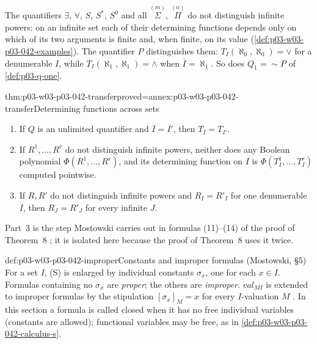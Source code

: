 The quantifiers \(\exists\), \(\forall\), \(S\), \(S^{*}\), \(S^0\) and
all \(\overset{(m)}{\Sigma}\), \(\overset{(n)}{\Pi}\) do not distinguish
infinite powers: on an infinite set each of their determining functions
depends only on which of its two arguments is finite and, when finite, on
its value (\cref{def:p03-w03-p03-042-examples}).  The quantifier \(P\)
distinguishes them: \(T_I(\aleph_0,\aleph_0)=\vee\) for a denumerable
\(I\), while \(T_I(\aleph_1,\aleph_1)=\wedge\) when \(\overline I=\aleph_1\).
So does \(Q_1={\sim}P\) of \cref{def:p03-q-one}.

\begin{hblemma}{thm:p03-w03-p03-042-transfer}{proved=annex:p03-w03-p03-042-transfer}{Determining functions across sets}
\begin{enumerate}
\item If \(Q\) is an unlimited quantifier and \(\overline I=\overline{I'}\),
      then \(T_I=T_{I'}\).
\item If \(R^1,\ldots,R^r\) do not distinguish infinite powers, neither
      does any Boolean polynomial \(\Phi(R^1,\ldots,R^r)\), and its
      determining function on \(I\) is
      \(\Phi(T^1_I,\ldots,T^r_I)\) computed pointwise.
\item If \(R,R'\) do not distinguish infinite powers and \(R_I=R'_I\) for
      one denumerable \(I\), then \(R_J=R'_J\) for every infinite \(J\).
\end{enumerate}
\end{hblemma}

Part~3 is the step Mostowski carries out in formulas (11)--(14) of the
proof of Theorem~8 \cite[pp.~26--27]{Mostowski1957}; it is isolated here
because the proof of Theorem~8 uses it twice.

\begin{hbdefinition}{def:p03-w03-p03-042-improper}{Constants and improper formulas (Mostowski, \S5)}
For a set \(I\), (S) is enlarged by individual constants \(\sigma_x\),
one for each \(x\in I\).  Formulas containing no \(\sigma_x\) are
\emph{proper}; the others are \emph{improper}.  \(\mathit{val}_{MI}\) is
extended to improper formulas by the stipulation \([\sigma_x]_M=x\) for
every \(I\)-valuation \(M\) \cite[p.~21]{Mostowski1957}.  In this
section a formula is called closed when it has no free individual
variables (constants are allowed); functional variables may be free, as
in \cref{def:p03-w03-p03-042-calculus-s}.
\end{hbdefinition}

